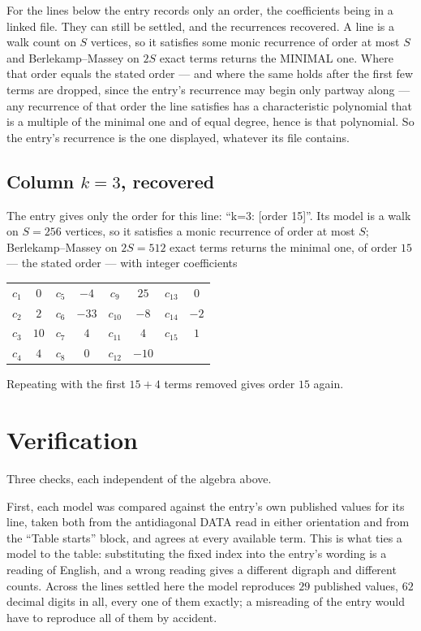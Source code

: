 \documentclass[11pt,a4paper]{article}
\theoremstyle{plain}
\theoremstyle{definition}
\begin{document}
For the lines below the entry records only an order, the coefficients being in a linked file.
They can still be settled, and the recurrences recovered. A line is a walk count on $S$
vertices, so it satisfies some monic recurrence of order at most $S$ and Berlekamp--Massey on
$2S$ exact terms returns the MINIMAL one. Where that order equals the stated order --- and
where the same holds after the first few terms are dropped, since the entry's recurrence may
begin only partway along --- any recurrence of that order the line satisfies has a
characteristic polynomial that is a multiple of the minimal one and of equal degree, hence is
that polynomial. So the entry's recurrence is the one displayed, whatever its file contains.

\subsection*{Column $k=3$, recovered}
The entry gives only the order for this line: ``k=3: [order 15]''. Its model is a walk on
$S=256$ vertices, so it satisfies a monic recurrence of order at most $S$;
Berlekamp--Massey on $2S=512$ exact terms returns the minimal one, of order
$15$ --- the stated order --- with integer coefficients
\begin{center}\small\begin{tabular}{cccccccc}
$c_{1}$ & $0$ & $c_{5}$ & $-4$ & $c_{9}$ & $25$ & $c_{13}$ & $0$ \\
$c_{2}$ & $2$ & $c_{6}$ & $-33$ & $c_{10}$ & $-8$ & $c_{14}$ & $-2$ \\
$c_{3}$ & $10$ & $c_{7}$ & $4$ & $c_{11}$ & $4$ & $c_{15}$ & $1$ \\
$c_{4}$ & $4$ & $c_{8}$ & $0$ & $c_{12}$ & $-10$ &  &  \\
\end{tabular}\end{center}
Repeating with the first $15+4$ terms removed gives order $15$ again.

\section{Verification}

Three checks, each independent of the algebra above.

First, each model was compared against the entry's own published values for its line, taken
both from the antidiagonal DATA read in either orientation and from the ``Table starts''
block, and agrees at every available term. This is what ties a model to the table:
substituting the fixed index into the entry's wording is a reading of English, and a wrong
reading gives a different digraph and different counts. Across the lines settled here the
model reproduces $29$ published values, $62$ decimal digits in all, every one of
them exactly; a misreading of the entry would have to reproduce all of them by accident.
\end{document}
